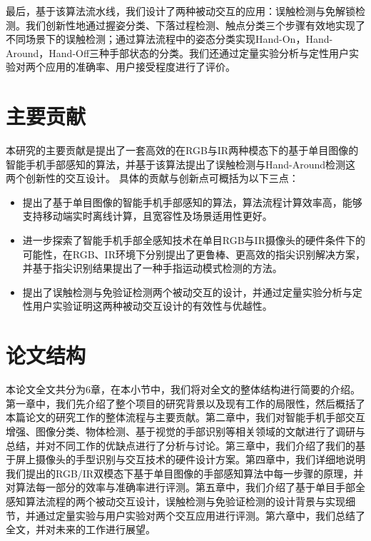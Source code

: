 最后，基于该算法流水线，我们设计了两种被动交互的应用：误触检测与免解锁检测。我们创新性地通过握姿分类、下落过程检测、触点分类三个步骤有效地实现了不同场景下的误触检测；通过算法流程中的姿态分类实现Hand-On，Hand-Around，Hand-Off三种手部状态的分类。我们还通过定量实验分析与定性用户实验对两个应用的准确率、用户接受程度进行了评价。


\section{主要贡献}

本研究的主要贡献是提出了一套高效的在RGB与IR两种模态下的基于单目图像的智能手机手部感知的算法，并基于该算法提出了误触检测与Hand-Around检测这两个创新性的交互设计。
具体的贡献与创新点可概括为以下三点：
\begin{itemize}
    \item 提出了基于单目图像的智能手机手部感知的算法，算法流程计算效率高，能够支持移动端实时离线计算，且宽容性及场景适用性更好。
    \item 进一步探索了智能手机手部全感知技术在单目RGB与IR摄像头的硬件条件下的可能性，在RGB、IR环境下分别提出了更鲁棒、更高效的指尖识别解决方案，并基于指尖识别结果提出了一种手指运动模式检测的方法。
    \item 提出了误触检测与免验证检测两个被动交互的设计，并通过定量实验分析与定性用户实验证明这两种被动交互设计的有效性与优越性。
\end{itemize}

\section{论文结构}
本论文全文共分为6章，在本小节中，我们将对全文的整体结构进行简要的介绍。第一章中，我们先介绍了整个项目的研究背景以及现有工作的局限性，然后概括了本篇论文的研究工作的整体流程与主要贡献。第二章中，我们对智能手机手部交互增强、图像分类、物体检测、基于视觉的手部识别等相关领域的文献进行了调研与总结，并对不同工作的优缺点进行了分析与讨论。第三章中，我们介绍了我们的基于屏上摄像头的手型识别与交互技术的硬件设计方案。第四章中，我们详细地说明我们提出的RGB/IR双模态下基于单目图像的手部感知算法中每一步骤的原理，并对算法每一部分的效率与准确率进行评测。第五章中，我们介绍了基于单目手部全感知算法流程的两个被动交互设计，误触检测与免验证检测的设计背景与实现细节，并通过定量实验与用户实验对两个交互应用进行评测。第六章中，我们总结了全文，并对未来的工作进行展望。
